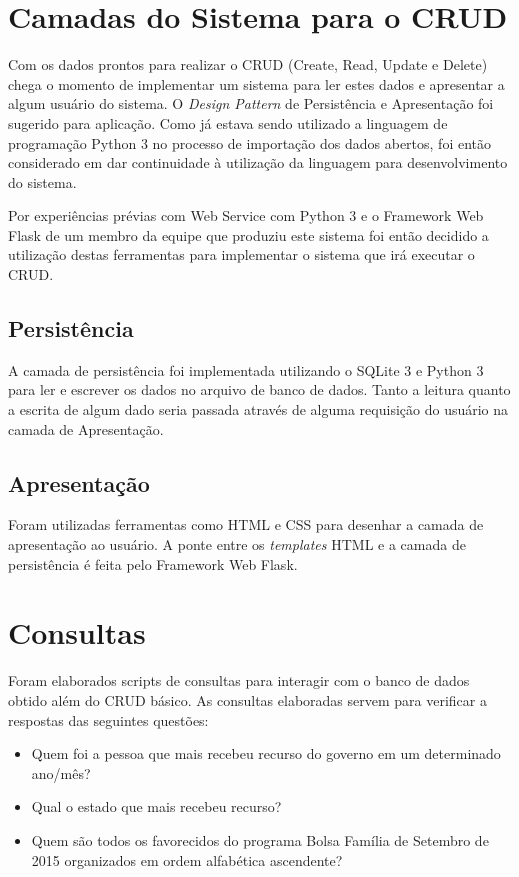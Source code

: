 \documentclass[12pt]{article}
\begin{document}
	\section{Camadas do Sistema para o CRUD}
	\label{sec:camadas}
	
	Com os dados prontos para realizar o CRUD (Create, Read, Update e Delete) chega o momento de implementar um sistema para ler estes dados e apresentar a algum usuário do sistema. O \textit{Design Pattern} de Persistência e Apresentação foi sugerido para aplicação. Como já estava sendo utilizado a linguagem de programação Python 3 no processo de importação dos dados abertos, foi então considerado em dar continuidade à utilização da linguagem para desenvolvimento do sistema.
	
	Por experiências prévias com Web Service com Python 3 e o Framework Web Flask de um membro da equipe que produziu este sistema foi então decidido a utilização destas ferramentas para implementar o sistema que irá executar o CRUD.
	
	\subsection{Persistência}
	\label{sec:pers}
	
	A camada de persistência foi implementada utilizando o SQLite 3 e Python 3 para ler e escrever os dados no arquivo de banco de dados. Tanto a leitura quanto a escrita de algum dado seria passada através de alguma requisição do usuário na camada de Apresentação.
	
	\subsection{Apresentação}
	\label{sec:apt}
	
	Foram utilizadas ferramentas como HTML e CSS para desenhar a camada de apresentação ao usuário. A ponte entre os \textit{templates} HTML e a camada de persistência é feita pelo Framework Web Flask.
	
	\section{Consultas} 
	\label{sec:consultas}
	
	Foram elaborados scripts de consultas para interagir com o banco de dados obtido além do CRUD básico. As consultas elaboradas servem para verificar a respostas das seguintes questões:
	
	\begin{itemize}
		\item Quem foi a pessoa que mais recebeu recurso do governo em um determinado ano/mês?
		\item Qual o estado que mais recebeu recurso?
		\item Quem são todos os favorecidos do programa Bolsa Família de Setembro de 2015 organizados em ordem alfabética ascendente?
	\end{itemize}
	
\end{document}

